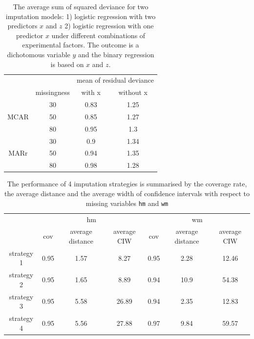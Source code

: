 	\begin{table}[ht!]
		\begin{tabular}{cc|cc}
			&             & \multicolumn{2}{c}{mean of residual deviance} \\ \cline{2-4} 
			\multicolumn{1}{c|}{}     & missingness & with x               & without x               \\
			\multicolumn{1}{c|}{}     & 30          & 0.83                 & 1.25                    \\
			\multicolumn{1}{c|}{MCAR} & 50          & 0.85                 & 1.27                    \\
			\multicolumn{1}{c|}{}     & 80          & 0.95                 & 1.3                     \\ \hline
			\multicolumn{1}{c|}{}     & 30          & 0.9                  & 1.34                    \\
			\multicolumn{1}{c|}{MARr} & 50          & 0.94                 & 1.35                    \\
			\multicolumn{1}{c|}{}     & 80          & 0.98                 & 1.28                   
		\end{tabular}
		\caption{The average sum of squared deviance for two imputation models: 1) logistic regression with two predictors $x$ and $z$ 2) logistic regression with one predictor $x$ under different combinations of experimental factors. The outcome is a dichotomous variable $y$ and the binary regression is based on $x$ and $z$.}
		\label{tab6_5}
	\end{table}
	
	\begin{table}[ht!]
		\begin{tabular}{c|ccc|ccc}
			& \multicolumn{3}{c|}{hm}               & \multicolumn{3}{c}{wm}                \\ \cline{2-7} 
			& cov  & average distance & average CIW & cov  & average distance & average CIW \\
			strategy 1 & 0.95 & 1.57             & 8.27        & 0.95 & 2.28             & 12.46       \\
			strategy 2 & 0.95 & 1.65             & 8.89        & 0.94 & 10.9             & 54.38       \\
			strategy 3 & 0.95 & 5.58             & 26.89       & 0.94 & 2.35             & 12.83       \\
			strategy 4 & 0.95 & 5.56             & 27.88       & 0.97 & 9.84             & 59.57      
		\end{tabular}
		\caption{The performance of 4 imputation strategies is summarised by the coverage rate, the average distance and the average width of confidence intervals with respect to missing variables \texttt{hm} and \texttt{wm}}
		\label{tab6_6}
	\end{table}
	
